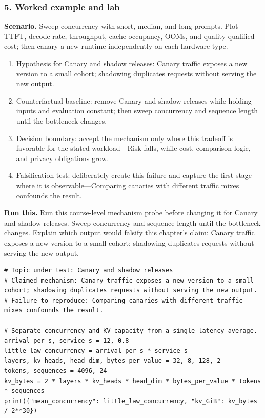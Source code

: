 \subsubsection*{5. Worked example and lab}
\textbf{Scenario.} Sweep concurrency with short, median, and long prompts. Plot TTFT, decode rate, throughput, cache occupancy, OOMs, and quality-qualified cost; then canary a new runtime independently on each hardware type.
\begin{enumerate}
\item Hypothesis for Canary and shadow releases: Canary traffic exposes a new version to a small cohort; shadowing duplicates requests without serving the new output.
\item Counterfactual baseline: remove Canary and shadow releases while holding inputs and evaluation constant; then sweep concurrency and sequence length until the bottleneck changes.
\item Decision boundary: accept the mechanism only where this tradeoff is favorable for the stated workload—Risk falls, while cost, comparison logic, and privacy obligations grow.
\item Falsification test: deliberately create this failure and capture the first stage where it is observable—Comparing canaries with different traffic mixes confounds the result.
\end{enumerate}
\textbf{Run this.} Run this course-level mechanism probe before changing it for Canary and shadow releases. Sweep concurrency and sequence length until the bottleneck changes. Explain which output would falsify this chapter's claim: Canary traffic exposes a new version to a small cohort; shadowing duplicates requests without serving the new output.
\begin{Verbatim}[fontsize=\scriptsize]
# Topic under test: Canary and shadow releases
# Claimed mechanism: Canary traffic exposes a new version to a small cohort; shadowing duplicates requests without serving the new output.
# Failure to reproduce: Comparing canaries with different traffic mixes confounds the result.

# Separate concurrency and KV capacity from a single latency average.
arrival_per_s, service_s = 12, 0.8
little_law_concurrency = arrival_per_s * service_s
layers, kv_heads, head_dim, bytes_per_value = 32, 8, 128, 2
tokens, sequences = 4096, 24
kv_bytes = 2 * layers * kv_heads * head_dim * bytes_per_value * tokens * sequences
print({"mean_concurrency": little_law_concurrency, "kv_GiB": kv_bytes / 2**30})
\end{Verbatim}
